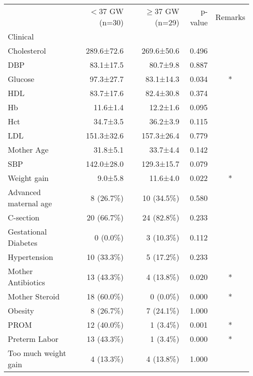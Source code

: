 \begin{tabular}{lrrrc}
\toprule
{} & $<$37 GW (n=30) & $\ge$37 GW (n=29) & p-value & Remarks \\
Clinical              &               &               &         &         \\
\midrule
Cholesterol           &    289.6±72.6 &    269.6±50.6 &   0.496 &         \\
DBP                   &     83.1±17.5 &      80.7±9.8 &   0.887 &         \\
Glucose               &     97.3±27.7 &     83.1±14.3 &   0.034 &       * \\
HDL                   &     83.7±17.6 &     82.4±30.8 &   0.374 &         \\
Hb                    &      11.6±1.4 &      12.2±1.6 &   0.095 &         \\
Hct                   &      34.7±3.5 &      36.2±3.9 &   0.115 &         \\
LDL                   &    151.3±32.6 &    157.3±26.4 &   0.779 &         \\
Mother Age            &      31.8±5.1 &      33.7±4.4 &   0.142 &         \\
SBP                   &    142.0±28.0 &    129.3±15.7 &   0.079 &         \\
Weight gain           &       9.0±5.8 &      11.6±4.0 &   0.022 &       * \\
Advanced maternal age &     8 (26.7\%) &    10 (34.5\%) &   0.580 &         \\
C-section             &    20 (66.7\%) &    24 (82.8\%) &   0.233 &         \\
Gestational Diabetes  &      0 (0.0\%) &     3 (10.3\%) &   0.112 &         \\
Hypertension          &    10 (33.3\%) &     5 (17.2\%) &   0.233 &         \\
Mother Antibiotics    &    13 (43.3\%) &     4 (13.8\%) &   0.020 &       * \\
Mother Steroid        &    18 (60.0\%) &      0 (0.0\%) &   0.000 &       * \\
Obesity               &     8 (26.7\%) &     7 (24.1\%) &   1.000 &         \\
PROM                  &    12 (40.0\%) &      1 (3.4\%) &   0.001 &       * \\
Preterm Labor         &    13 (43.3\%) &      1 (3.4\%) &   0.000 &       * \\
Too much weight gain  &     4 (13.3\%) &     4 (13.8\%) &   1.000 &         \\
\bottomrule
\end{tabular}
